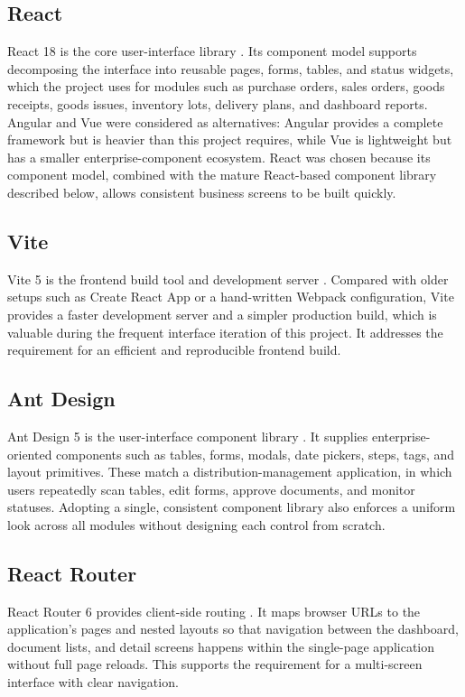 \subsection{React}
React 18 is the core user-interface library \cite{react18}. Its component model
supports decomposing the interface into reusable pages, forms, tables, and status
widgets, which the project uses for modules such as purchase orders, sales orders,
goods receipts, goods issues, inventory lots, delivery plans, and dashboard
reports. Angular and Vue were considered as alternatives: Angular provides a
complete framework but is heavier than this project requires, while Vue is
lightweight but has a smaller enterprise-component ecosystem. React was chosen
because its component model, combined with the mature React-based component
library described below, allows consistent business screens to be built quickly.

\subsection{Vite}
Vite 5 is the frontend build tool and development server \cite{vite5}. Compared
with older setups such as Create React App or a hand-written Webpack
configuration, Vite provides a faster development server and a simpler production
build, which is valuable during the frequent interface iteration of this project.
It addresses the requirement for an efficient and reproducible frontend build.

\subsection{Ant Design}
Ant Design 5 is the user-interface component library \cite{antdesign}. It supplies
enterprise-oriented components such as tables, forms, modals, date pickers, steps,
tags, and layout primitives. These match a distribution-management application, in
which users repeatedly scan tables, edit forms, approve documents, and monitor
statuses. Adopting a single, consistent component library also enforces a uniform
look across all modules without designing each control from scratch.

\subsection{React Router}
React Router 6 provides client-side routing \cite{reactRouter}. It maps browser
URLs to the application's pages and nested layouts so that navigation between the
dashboard, document lists, and detail screens happens within the single-page
application without full page reloads. This supports the requirement for a
multi-screen interface with clear navigation.

